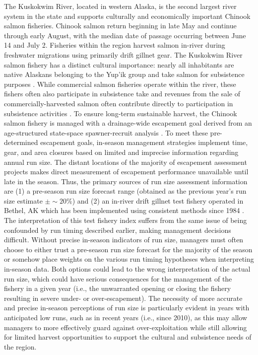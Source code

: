 \documentclass[12pt,]{book}
\theoremstyle{definition}
\theoremstyle{definition}
\theoremstyle{definition}
\theoremstyle{remark}
\begin{document}
The Kuskokwim River, located in western Alaska, is the second largest
river system in the state and supports culturally and economically
important Chinook salmon fisheries. Chinook salmon return beginning in
late May and continue through early August, with the median date of
passage occurring between June 14 and July 2. Fisheries within the
region harvest salmon in-river during freshwater migrations using
primarily drift gillnet gear. The Kuskokwim River salmon fishery has a
distinct cultural importance: nearly all inhabitants are native Alaskans
belonging to the Yup'ik group and take salmon for subsistence purposes
\citep{linderman-bergstrom-2009}. While commercial salmon fisheries
operate within the river, these fishers often also participate in
subsistence take and revenues from the sale of commercially-harvested
salmon often contribute directly to participation in subsistence
activities \citep{wolfe-spaeder-2009}. To ensure long-term sustainable
harvest, the Chinook salmon fishery is managed with a drainage-wide
escapement goal derived from an age-structured state-space
spawner-recruit analysis
\citep{hamazaki-etal-2012, staton-etal-2017-intseq}. To meet these
pre-determined escapement goals, in-season management strategies
implement time, gear, and area closures based on limited and imprecise
information regarding annual run size. The distant locations of the
majority of escapement assessment projects makes direct measurement of
escapement performance unavailable until late in the season. Thus, the
primary sources of run size assessment information are (1) a pre-season
run size forecast range (obtained as the previous year's run size
estimate \(\pm \sim 20\%\)) and (2) an in-river drift gillnet test
fishery operated in Bethel, AK which has been implemented using
consistent methods since 1984 \citep[described in][]{bue-lipka-2016}.
The interpretation of this test fishery index suffers from the same
issue of being confounded by run timing described earlier, making
management decisions difficult. Without precise in-season indicators of
run size, managers must often choose to either trust a pre-season run
size forecast for the majority of the season or somehow place weights on
the various run timing hypotheses when interpreting in-season data. Both
options could lead to the wrong interpretation of the actual run size,
which could have serious consequences for the management of the fishery
in a given year (i.e., the unwarranted opening or closing the fishery
resulting in severe under- or over-escapement). The necessity of more
accurate and precise in-season perceptions of run size is particularly
evident in years with anticipated low runs, such as in recent years
(i.e., since 2010), as this may allow managers to more effectively guard
against over-exploitation while still allowing for limited harvest
opportunities to support the cultural and subsistence needs of the
region.
\end{document}
